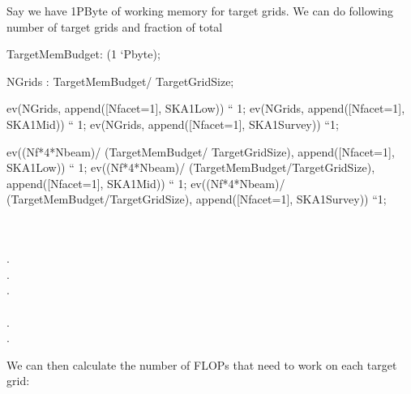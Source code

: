 \documentclass[useAMS,usenatbib,referee]{article}
\begin{document}
Say we have 1PByte of working memory for target grids. We can do
following number of target grids and fraction of total
\begin{maxima}[]
TargetMemBudget: (1 `Pbyte);

NGrids : TargetMemBudget/ TargetGridSize;

ev(NGrids, append([Nfacet=1], SKA1Low)) `` 1;
ev(NGrids, append([Nfacet=1], SKA1Mid))  `` 1;
ev(NGrids, append([Nfacet=1], SKA1Survey)) ``1;

ev((Nf*4*Nbeam)/  (TargetMemBudget/ TargetGridSize), append([Nfacet=1], SKA1Low)) `` 1;
ev((Nf*4*Nbeam)/ (TargetMemBudget/TargetGridSize), append([Nfacet=1], SKA1Mid))  `` 1;
ev((Nf*4*Nbeam)/ (TargetMemBudget/TargetGridSize), append([Nfacet=1], SKA1Survey)) ``1;


\maximaoutput*
{}\; \\
 \\
. \\
. \\
. \\
 \\
. \\
. \\
\end{maxima}

We can then calculate the number of FLOPs that need to work on each
target grid:
\end{document}
